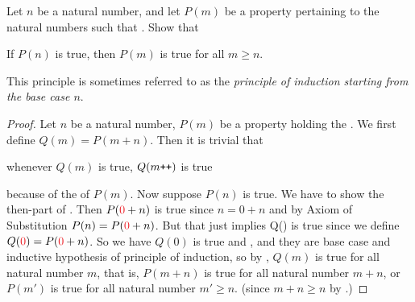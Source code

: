 \begin{exercise} \label{exercise 2.2.7}
Let \(n\) be a natural number, and let \(P(m)\) be a property pertaining to the natural numbers such that .  Show that
    \begin{center}
    If \(P(n)\) is true, then \(P(m)\) is true for all \(m \geq n\). 
    \end{center}
This principle is sometimes referred to as the \emph{principle of induction starting from the base case \(n\)}.
\end{exercise}
\begin{proof}
Let \(n\) be a natural number, \(P(m)\) be a property holding the . We first define \(Q(m) = P(m + n)\). Then it is trivial that     \begin{center}
    whenever \(Q(m)\) is true, \(Q(m\texttt{++})\) is true 
    \end{center}
because of the  of \(P(m)\).
Now suppose \(P(n)\) is true. We have to show the then-part of .
Then \(P(\RED{0} + n)\) is true since \(n = 0 + n\) and by Axiom of Substitution  \(P(n) = P(\RED{0} + n)\). But that just implies Q() is true since we define \(Q(\RED{0}) = P(\RED{0} + n)\).
So we have \(Q(0)\) is true and , and they are base case and inductive hypothesis of principle of induction, so by , \(Q(m)\) is true for all natural number \(m\), that is, \(P(m + n)\) is true for all natural number \(m + n\), or \(P(m')\) is true for all natural number \(m' \geq n\). (since \(m + n \geq n\) by .)
\end{proof}